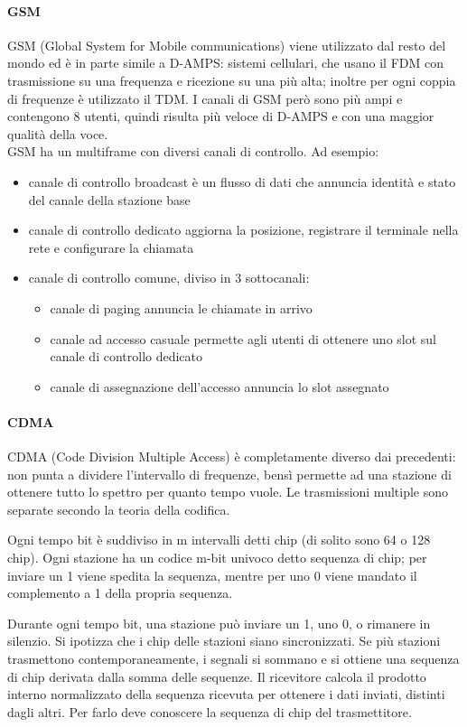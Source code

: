 \paragraph{GSM}
GSM (Global System for Mobile communications) viene utilizzato dal resto del mondo ed è in parte simile a D-AMPS:
sistemi cellulari, che usano il FDM con trasmissione su una frequenza e ricezione su una più alta;
inoltre per ogni coppia di frequenze è utilizzato il TDM.
I canali di GSM però sono più ampi e contengono 8 utenti, quindi risulta più veloce di D-AMPS e con una maggior qualità della voce.\\
GSM ha un multiframe con diversi canali di controllo. Ad esempio:
\begin{itemize}
\item canale di controllo broadcast è un flusso di dati che annuncia identità e stato del canale della stazione base
\item canale di controllo dedicato aggiorna la posizione, registrare il terminale nella rete e configurare la chiamata
\item canale di controllo comune, diviso in 3 sottocanali:
\begin{itemize}
\item canale di paging annuncia le chiamate in arrivo
\item canale ad accesso casuale permette agli utenti di ottenere uno slot sul canale di controllo dedicato
\item canale di assegnazione dell'accesso annuncia lo slot assegnato
\end{itemize}
\end{itemize}

\paragraph{CDMA}
CDMA (Code Division Multiple Access) è completamente diverso dai precedenti: 
non punta a dividere l'intervallo di frequenze, bensì permette ad una stazione di ottenere tutto lo spettro per quanto tempo vuole.
Le trasmissioni multiple sono separate secondo la teoria della codifica.

Ogni tempo bit è suddiviso in m intervalli detti chip (di solito sono 64 o 128 chip). 
Ogni stazione ha un codice m-bit univoco detto sequenza di chip;
per inviare un 1 viene spedita la sequenza, mentre per uno 0 viene mandato il complemento a 1 della propria sequenza.

Durante ogni tempo bit, una stazione può inviare un 1, uno 0, o rimanere in silenzio.
Si ipotizza che i chip delle stazioni siano sincronizzati.
Se più stazioni trasmettono contemporaneamente, i segnali si sommano e si ottiene una sequenza di chip derivata dalla somma delle sequenze.
Il ricevitore calcola il prodotto interno normalizzato della sequenza ricevuta per ottenere i dati inviati, distinti dagli altri.
Per farlo deve conoscere la sequenza di chip del trasmettitore.




